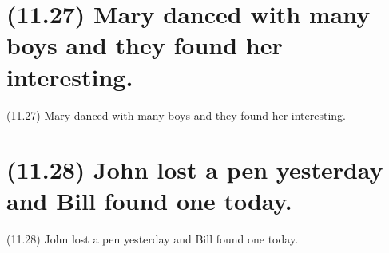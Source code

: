 \documentclass{article}
\begin{document}
\clearpage

%
%

\section*{(11.27) Mary danced with many boys and they found her interesting.}

\bigbreak
\begin{enumerate*}
\item[(11.27)] Mary danced with many boys and they found her interesting.
\end{enumerate*}
\bigbreak

\bigbreak
\begin{minipage}{\textwidth}
\end{minipage}
\bigbreak

\clearpage

%
%

\section*{(11.28) John lost a pen yesterday and Bill found one today.}

\bigbreak
\begin{enumerate*}
\item[(11.28)] John lost a pen yesterday and Bill found one today.
\end{enumerate*}
\bigbreak

\bigbreak
\begin{minipage}{\textwidth}
\end{minipage}
\bigbreak
\end{document}
